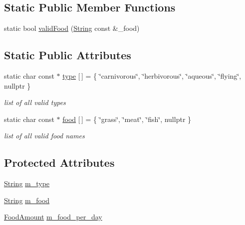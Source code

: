 \subsection*{Static Public Member Functions}
\begin{DoxyCompactItemize}
\item 
static bool \hyperlink{classDinoFoodType_a9c4b7db38e82a1774b0c2a9ff4e296f2}{valid\+Food} (\hyperlink{classString}{String} const \&\+\_\+food)
\end{DoxyCompactItemize}
\subsection*{Static Public Attributes}
\begin{DoxyCompactItemize}
\item 
static char const  $\ast$ \hyperlink{classDinoFoodType_afb414c3cfef06b7e74361f92296a3b13}{type} \mbox{[}$\,$\mbox{]} = \{ \char`\"{}carnivorous\char`\"{}, \char`\"{}herbivorous\char`\"{}, \char`\"{}aqueous\char`\"{}, \char`\"{}flying\char`\"{}, nullptr \}
\begin{DoxyCompactList}\small\item\em list of all valid types \end{DoxyCompactList}\item 
static char const  $\ast$ \hyperlink{classDinoFoodType_acb68d96669c399a87f3f6d2d19040564}{food} \mbox{[}$\,$\mbox{]} = \{ \char`\"{}grass\char`\"{}, \char`\"{}meat\char`\"{}, \char`\"{}fish\char`\"{}, nullptr \}
\begin{DoxyCompactList}\small\item\em list of all valid food names \end{DoxyCompactList}\end{DoxyCompactItemize}
\subsection*{Protected Attributes}
\begin{DoxyCompactItemize}
\item 
\hyperlink{classString}{String} \hyperlink{classDinoFoodType_adc04adf9e6372245441b806c40d90f6e}{m\+\_\+type}
\item 
\hyperlink{classString}{String} \hyperlink{classDinoFoodType_a4cd78167ce1e2d367ba0eaf2ceb757e6}{m\+\_\+food}
\item 
\hyperlink{DinoFoodType_8hpp_a81be3c5791355e37ef9afec946f6ff50}{Food\+Amount} \hyperlink{classDinoFoodType_a7fce2386b06bca376525c454a1b8e572}{m\+\_\+food\+\_\+per\+\_\+day}
\end{DoxyCompactItemize}
